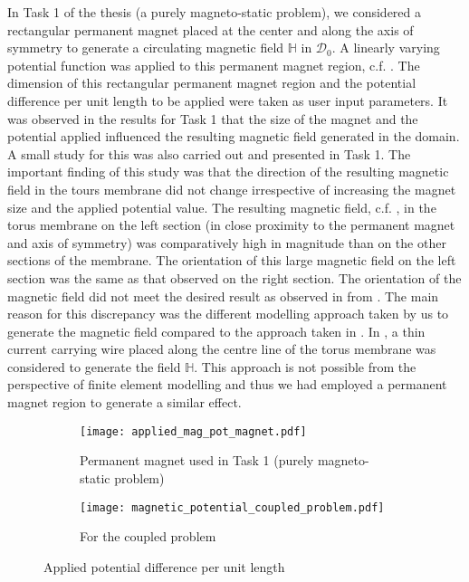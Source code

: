 In Task 1 of the thesis (a purely magneto-static problem), we considered a rectangular permanent magnet placed at the center and along the axis of symmetry to generate a circulating magnetic field $\mathbb{H}$ in $\mathcal{D}_0$. A linearly varying potential function was applied to this permanent magnet region, c.f. . The dimension of this rectangular permanent magnet region and the potential difference per unit length to be applied were taken as user input parameters. It was observed in the results for Task 1 that the size of the magnet and the potential applied influenced the resulting magnetic field generated in the domain. A small study for this was also carried out and presented in Task 1. The important finding of this study was that the direction of the resulting magnetic field in the tours membrane did not change irrespective of increasing the magnet size and the applied potential value. The resulting magnetic field, c.f. , in the torus membrane on the left section (in close proximity to the permanent magnet and axis of symmetry) was comparatively high in magnitude than on the other sections of the membrane. The orientation of this large magnetic field on the left section was the same as that observed on the right section. The orientation of the magnetic field did not meet the desired result as observed in  from \cite{reddy_toroid}. The main reason for this discrepancy was the different modelling approach taken by us to generate the magnetic field compared to the approach taken in \cite{reddy_toroid}. In \cite{reddy_toroid}, a thin current carrying wire placed along the centre line of the torus membrane was considered to generate the field $\mathbb{H}$. This approach is not possible from the perspective of finite element modelling and thus we had employed a permanent magnet region to generate a similar effect. \par 

\begin{figure}[h]
\centering
\begin{subfigure}{0.35\textwidth}
\centering
\texttt{[image: applied\_mag\_pot\_magnet.pdf]}
\caption{Permanent magnet used in Task 1 (purely magneto-static problem)}
\label{fig:3.4.1}
\end{subfigure}
\begin{subfigure}{0.5\textwidth}
\centering
\texttt{[image: magnetic\_potential\_coupled\_problem.pdf]}
\caption{For the coupled problem}
\label{fig:3.4.2}
\end{subfigure}
\caption{Applied potential difference per unit length}
\label{fig:3.4}
\end{figure}

